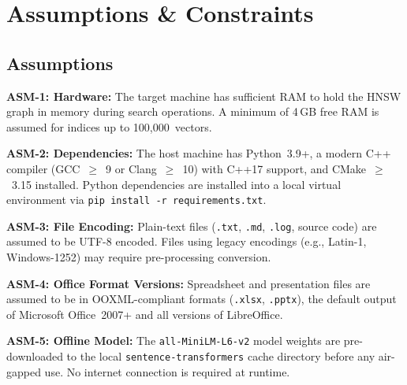 \documentclass[12pt, a4paper]{article}
\begin{document}
\section{Assumptions \& Constraints}

\subsection{Assumptions}
\begin{prolist}
    \item \textbf{ASM-1: Hardware:} The target machine has sufficient RAM
    to hold the HNSW graph in memory during search operations. A minimum of
    4\,GB free RAM is assumed for indices up to 100,000~vectors.

    \item \textbf{ASM-2: Dependencies:} The host machine has Python~3.9+,
    a modern C++ compiler (GCC~$\geq$~9 or Clang~$\geq$~10) with C++17
    support, and CMake~$\geq$~3.15 installed. Python dependencies are
    installed into a local virtual environment via
    \texttt{pip install -r requirements.txt}.

    \item \textbf{ASM-3: File Encoding:} Plain-text files (\texttt{.txt},
    \texttt{.md}, \texttt{.log}, source code) are assumed to be UTF-8
    encoded. Files using legacy encodings (e.g., Latin-1,
    Windows-1252) may require pre-processing conversion.

    \item \textbf{ASM-4: Office Format Versions:} Spreadsheet and
    presentation files are assumed to be in OOXML-compliant formats
    (\texttt{.xlsx}, \texttt{.pptx}), the default output of Microsoft
    Office~2007+ and all versions of LibreOffice.

    \item \textbf{ASM-5: Offline Model:} The \texttt{all-MiniLM-L6-v2}
    model weights are pre-downloaded to the local
    \texttt{sentence-transformers} cache directory before any air-gapped
    use. No internet connection is required at runtime.
\end{prolist}
\end{document}
